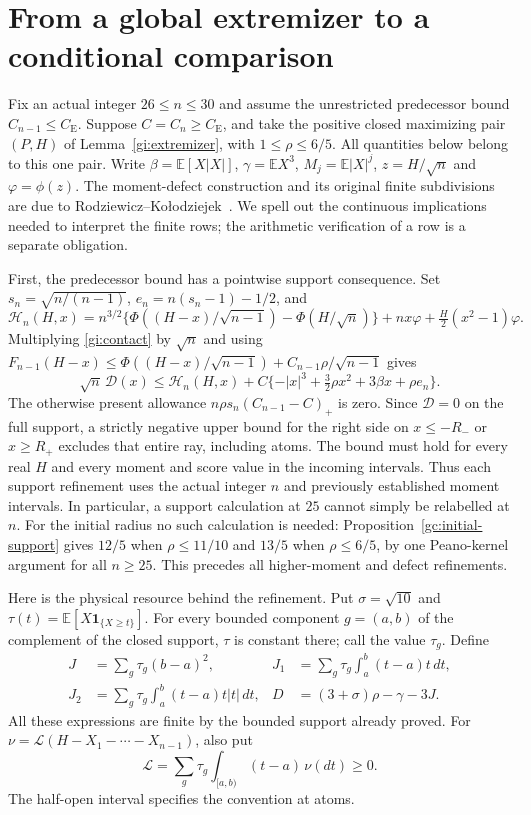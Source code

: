 \documentclass[aop,preprint]{imsart}
\theoremstyle{definition}
\newcommand{\CE}{C_{\mathrm E}}
\newcommand{\E}{\mathbb E}
\numberwithin{equation}{section}
\begin{document}
\section{From a global extremizer to a conditional comparison}\label{loc:section}

Fix an actual integer $26\le n\le30$ and assume the unrestricted
predecessor bound $C_{n-1}\le\CE$. Suppose $C=C_n\ge\CE$, and take
the positive closed maximizing pair $(P,H)$ of
Lemma~\ref{gi:extremizer}, with $1\le\rho\le6/5$.
All quantities below belong to this one pair. Write
$\beta=\E[X|X|]$, $\gamma=\E X^3$, $M_j=\E|X|^j$,
$z=H/\sqrt n$ and $\varphi=\phi(z)$.
The moment-defect construction and its original finite subdivisions are
due to Rodziewicz--Ko\l{}odziejek~\cite{RK2026}.
We spell out the continuous implications needed to interpret the finite
rows; the arithmetic verification of a row is a separate obligation.

First, the predecessor bound has a pointwise support consequence.
Set $s_n=\sqrt{n/(n-1)}$, $e_n=n(s_n-1)-1/2$, and
\[
 \mathcal H_n(H,x)=n^{3/2}
 \{\Phi((H-x)/\sqrt{n-1})-\Phi(H/\sqrt n)\}
 +nx\varphi+\tfrac H2(x^2-1)\varphi.
\]
Multiplying \eqref{gi:contact} by $\sqrt n$ and using
$F_{n-1}(H-x)\le\Phi((H-x)/\sqrt{n-1})+
C_{n-1}\rho/\sqrt{n-1}$ gives
\begin{equation}\label{loc:support-test}
 \sqrt n\,\mathcal D(x)\le\mathcal H_n(H,x)
 +C\{-|x|^3+\tfrac32\rho x^2+3\beta x+\rho e_n\}.
\end{equation}
The otherwise present allowance
$n\rho s_n(C_{n-1}-C)_+$ is zero. Since $\mathcal D=0$ on the
full support, a strictly negative upper bound for the right side on
$x\le-R_-$ or $x\ge R_+$ excludes that entire ray, including atoms.
The bound must hold for every real $H$ and every moment and score value
in the incoming intervals. Thus each support refinement uses the actual
integer $n$ and previously established moment intervals. In particular,
a support calculation at $25$ cannot simply be relabelled at $n$.
For the initial radius no such calculation is needed:
Proposition~\ref{gc:initial-support} gives $12/5$ when $\rho\le11/10$
and $13/5$ when $\rho\le6/5$, by one Peano-kernel argument for all
$n\ge25$. This precedes all higher-moment and defect refinements.

Here is the physical resource behind the refinement. Put
$\sigma=\sqrt{10}$ and $\tau(t)=\E[X\mathbf1_{\{X\ge t\}}]$.
For every bounded component $g=(a,b)$ of the complement of the closed
support, $\tau$ is constant there; call the value $\tau_g$. Define
\begin{align*}
 J&=\sum_g\tau_g(b-a)^2,&
 J_1&=\sum_g\tau_g\int_a^b(t-a)t\,dt,\\
 J_2&=\sum_g\tau_g\int_a^b(t-a)t|t|\,dt,&
 D&=(3+\sigma)\rho-\gamma-3J.
\end{align*}
All these expressions are finite by the bounded support already proved.
For $\nu=\mathcal L(H-X_1-\cdots-X_{n-1})$, also put
\[
 \mathcal L=\sum_g\tau_g\int_{[a,b)}(t-a)\,\nu(dt)\ge0.
\]
The half-open interval specifies the convention at atoms.
\end{document}
